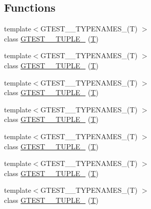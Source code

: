 \subsection*{Functions}
\begin{DoxyCompactItemize}
\item 
{\footnotesize template$<$G\+T\+E\+S\+T\+\_\+\_\+\+T\+Y\+P\+E\+N\+A\+M\+E\+S\+\_\+(\+T) $>$ }\\class \hyperlink{namespacestd_1_1tr1_a9971f52f994f142fe36c786b991cfd3e}{G\+T\+E\+S\+T\+\_\+\_\+\+T\+U\+P\+L\+E\+\_\+} (\hyperlink{functions__7_8js_adf1f3edb9115acb0a1e04209b7a9937b}{T})
\item 
{\footnotesize template$<$G\+T\+E\+S\+T\+\_\+\_\+\+T\+Y\+P\+E\+N\+A\+M\+E\+S\+\_\+(\+T) $>$ }\\class \hyperlink{namespacestd_1_1tr1_a05651180c3a4c06fe0f3b09144b82b93}{G\+T\+E\+S\+T\+\_\+\_\+\+T\+U\+P\+L\+E\+\_\+} (\hyperlink{functions__7_8js_adf1f3edb9115acb0a1e04209b7a9937b}{T})
\item 
{\footnotesize template$<$G\+T\+E\+S\+T\+\_\+\_\+\+T\+Y\+P\+E\+N\+A\+M\+E\+S\+\_\+(\+T) $>$ }\\class \hyperlink{namespacestd_1_1tr1_a368170c49cc7d7f130c0564bbad01205}{G\+T\+E\+S\+T\+\_\+\_\+\+T\+U\+P\+L\+E\+\_\+} (\hyperlink{functions__7_8js_adf1f3edb9115acb0a1e04209b7a9937b}{T})
\item 
{\footnotesize template$<$G\+T\+E\+S\+T\+\_\+\_\+\+T\+Y\+P\+E\+N\+A\+M\+E\+S\+\_\+(\+T) $>$ }\\class \hyperlink{namespacestd_1_1tr1_a661b17d2b7137863f06a016762f5c888}{G\+T\+E\+S\+T\+\_\+\_\+\+T\+U\+P\+L\+E\+\_\+} (\hyperlink{functions__7_8js_adf1f3edb9115acb0a1e04209b7a9937b}{T})
\item 
{\footnotesize template$<$G\+T\+E\+S\+T\+\_\+\_\+\+T\+Y\+P\+E\+N\+A\+M\+E\+S\+\_\+(\+T) $>$ }\\class \hyperlink{namespacestd_1_1tr1_a51b070e2eb5e6bb83a290f35c19667dd}{G\+T\+E\+S\+T\+\_\+\_\+\+T\+U\+P\+L\+E\+\_\+} (\hyperlink{functions__7_8js_adf1f3edb9115acb0a1e04209b7a9937b}{T})
\item 
{\footnotesize template$<$G\+T\+E\+S\+T\+\_\+\_\+\+T\+Y\+P\+E\+N\+A\+M\+E\+S\+\_\+(\+T) $>$ }\\class \hyperlink{namespacestd_1_1tr1_a485b05fdbbcfcf7ad5e4234e17702268}{G\+T\+E\+S\+T\+\_\+\_\+\+T\+U\+P\+L\+E\+\_\+} (\hyperlink{functions__7_8js_adf1f3edb9115acb0a1e04209b7a9937b}{T})
\item 
{\footnotesize template$<$G\+T\+E\+S\+T\+\_\+\_\+\+T\+Y\+P\+E\+N\+A\+M\+E\+S\+\_\+(\+T) $>$ }\\class \hyperlink{namespacestd_1_1tr1_ab451b390a95ee0555d7a43b67ea348aa}{G\+T\+E\+S\+T\+\_\+\_\+\+T\+U\+P\+L\+E\+\_\+} (\hyperlink{functions__7_8js_adf1f3edb9115acb0a1e04209b7a9937b}{T})

\end{DoxyCompactItemize}
